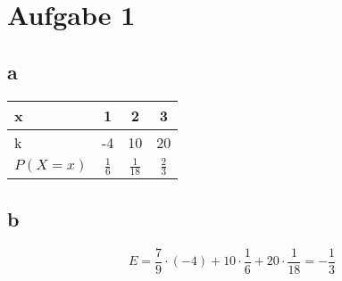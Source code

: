 
\section{Aufgabe 1}
\subsection{a}
\begin{tabular}{l|ccc}
  x & 1 & 2 & 3 \\
  \hline
  k & -4 &10 & 20 \\
  \hline
  $P(X=x)$ &
  $\frac{1}{6}$ &
  $\frac{1}{18}$ &
  $\frac{2}{3}$
\end{tabular}

\subsection{b}
\[ E = \frac{7}{9} \cdot (-4) + 
10 \cdot \frac{1}{6} + 
20 \cdot \frac{1}{18} 
= -\frac{1}{3} \]